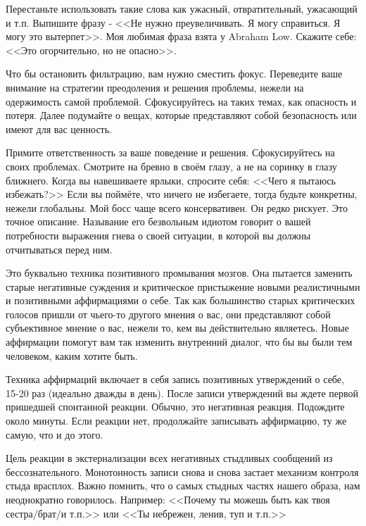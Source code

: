\documentclass[10pt, fleqn]{article}
\begin{document}

Перестаньте использовать такие слова как ужасный, отвратительный, ужасающий и т.п. Выпишите фразу - <<Не нужно преувеличивать. Я могу справиться. Я могу это вытерпет>>. Моя любимая фраза взята у Abraham Low. Скажите себе: <<Это огорчительно, но не опасно>>.

Что бы остановить фильтрацию, вам нужно сместить фокус. Переведите ваше внимание на стратегии преодоления и решения проблемы, нежели на одержимость самой проблемой. Сфокусируйтесь на таких темах, как опасность и потеря. Далее подумайте о вещах, которые представляют собой безопасность или имеют для вас ценность.


Примите ответственность за ваше поведение и решения. Сфокусируйтесь на своих проблемах. Смотрите на бревно в своём глазу, а не на соринку в глазу ближнего. Когда вы навешиваете ярлыки, спросите себя: <<Чего я пытаюсь избежать?>> Если вы поймёте, что ничего не избегаете, тогда будьте конкретны, нежели глобальны. Мой босс чаще всего консервативен. Он редко рискует. Это точное описание. Называние его безвольным идиотом говорит о вашей потребности выражения гнева о своей ситуации, в которой вы должны отчитываться перед ним.


Это буквально техника позитивного промывания мозгов. Она пытается заменить старые негативные суждения и критическое пристыжение новыми реалистичными и позитивными аффирмациями о себе. Так как большинство старых критических голосов пришли от чьего-то другого мнения о вас, они представляют собой субъективное мнение о вас, нежели то, кем вы действительно являетесь. Новые аффирмации помогут вам так изменить внутренний диалог, что бы вы были тем человеком, каким хотите быть.

Техника аффирмаций включает в себя запись позитивных утверждений о себе, 15-20 раз (идеально дважды в день). После записи утверждений вы ждете первой пришедшей спонтанной реакции. Обычно, это негативная реакция. Подождите около минуты. Если реакции нет, продолжайте записывать аффирмацию, ту же самую, что и до этого.

Цель реакции в экстернализации всех негативных стыдливых сообщений из бессознательного. Монотонность записи снова и снова застает механизм контроля стыда врасплох. Важно помнить, что о самых стыдных частях нашего образа, нам неоднократно говорилось. Например: <<Почему ты можешь быть как твоя сестра/брат/и т.п.>> или <<Ты небрежен, ленив, туп и т.п.>>
\end{document}
